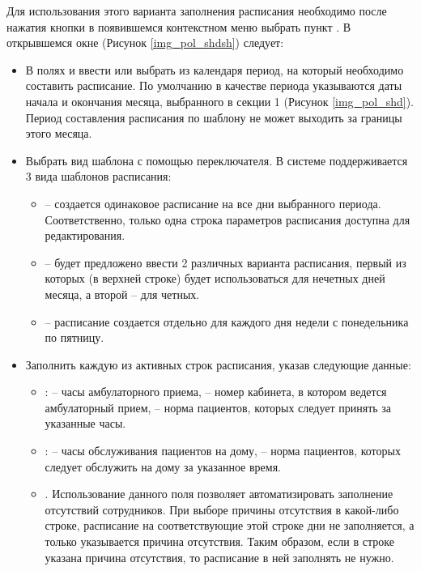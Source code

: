 Для использования этого варианта заполнения расписания необходимо после нажатия кнопки   в появившемся контекстном меню выбрать пункт . В открывшемся окне  (Рисунок \ref{img_pol_shdsh}) следует:
\begin{itemize}
 \item В полях  и  ввести или выбрать из календаря период, на который необходимо составить расписание. По умолчанию в качестве периода указываются даты начала и окончания месяца, выбранного в секции 1 (Рисунок \ref{img_pol_shd}). Период составления расписания по шаблону не может выходить за границы этого месяца.
 \item Выбрать вид шаблона с помощью переключателя. В системе поддерживается 3 вида шаблонов расписания:
 \begin{itemize}
  \item {} – создается одинаковое расписание на все дни выбранного периода. Соответственно, только одна строка параметров расписания доступна для редактирования.
  \item {} – будет предложено ввести 2 различных варианта расписания, первый из которых (в верхней строке) будет использоваться для нечетных дней месяца, а второй – для четных. 
  \item {} – расписание создается отдельно для каждого дня недели с понедельника по пятницу.
 \end{itemize}	
 \item Заполнить каждую из активных строк расписания, указав следующие данные:
 \begin{itemize}
  \item {}:  – часы амбулаторного приема,  – номер кабинета, в котором ведется амбулаторный прием,  – норма пациентов, которых следует принять за указанные часы.
  \item {}:  – часы обслуживания пациентов на дому,  – норма пациентов, которых следует обслужить на дому за указанное время.
  \item {}. Использование данного поля позволяет автоматизировать заполнение отсутствий сотрудников. При выборе причины отсутствия в какой-либо строке, расписание на соответствующие этой строке дни не заполняется, а только указывается причина отсутствия. Таким образом, если в строке указана причина отсутствия, то расписание в ней заполнять не нужно.
 \end{itemize} 

\end{itemize}

